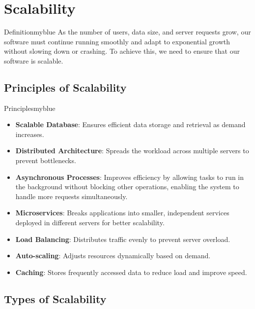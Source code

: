 \newpage
\section{Scalability}  
\begin{prettyBox}{Definition}{myblue}  
As the number of users, data size, and server requests grow,  
our software must continue running smoothly and adapt to exponential growth  
without slowing down or crashing. To achieve this, we need to ensure that our software is scalable.  
\end{prettyBox}

\vspace{0.5cm}

\subsection{Principles of Scalability}  
\begin{prettyBox}{Principles}{myblue}  
\begin{itemize}  
\item \textbf{Scalable Database}: Ensures efficient data storage and 
retrieval as demand increases.  
\item \textbf{Distributed Architecture}: Spreads the workload across multiple 
servers to prevent bottlenecks. 
\item \textbf{Asynchronous Processes}: Improves efficiency by allowing tasks
to run in the background without blocking other operations, enabling the
system to handle more requests simultaneously.
\item \textbf{Microservices}: Breaks applications into smaller, independent 
services deployed in different servers for better scalability.  
\item \textbf{Load Balancing}: Distributes traffic evenly to prevent server 
overload.  
\item \textbf{Auto-scaling}: Adjusts resources dynamically based on demand.  
\item \textbf{Caching}: Stores frequently accessed data to reduce load and 
improve speed.  
\end{itemize}  
\end{prettyBox}

\vspace{0.5cm}

\subsection{Types of Scalability}  

